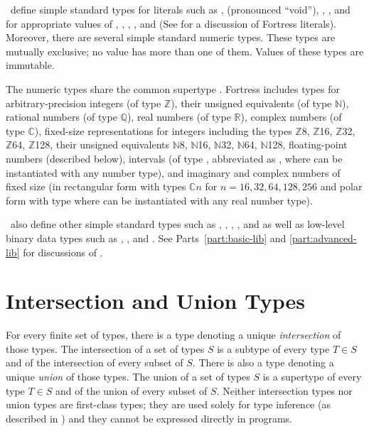 \Library\ define simple standard types for literals such as
,
\TYP{()} (pronounced ``void''),
, , and
for appropriate values of , , , , and 
(See  for a discussion of Fortress literals).
Moreover, there are several simple standard numeric types.
These types are mutually exclusive; no value has more than one of them.
Values of these types are immutable.

The numeric types share the common supertype .
Fortress includes types for
arbitrary-precision integers (of type $\mathbb{Z}$),
their unsigned equivalents (of type $\mathbb{N}$),
rational numbers (of type $\mathbb{Q}$),
real numbers (of type $\mathbb{R}$),
complex numbers (of type $\mathbb{C}$),
fixed-size representations for integers including the types
{$\mathbb{Z}$8}, {$\mathbb{Z}$16}, {$\mathbb{Z}$32}, {$\mathbb{Z}$64},
{$\mathbb{Z}$128}, their unsigned equivalents
{$\mathbb{N}$8}, {$\mathbb{N}$16}, {$\mathbb{N}$32}, {$\mathbb{N}$64},
{$\mathbb{N}$128},
floating-point numbers (described below),
intervals (of type ,
abbreviated as ,
where  can be instantiated
with any number type), and imaginary and complex numbers of fixed size
(in rectangular form with types $\mathbb{C}n$ for $n = 16, 32, 64, 128, 256$
and polar form with type  where  can
be instantiated with any real number type).

\Library\ also define other simple standard types such as ,
, , , and 
as well as low-level binary data types such as ,
, and .
See Parts~\ref{part:basic-lib} and \ref{part:advanced-lib} for discussions
of \library.


\section{Intersection and Union Types}

For every finite set of types, there is a type denoting a unique
\emph{intersection} of those types.
The intersection of a set of types $S$ is a subtype of every type $T \in S$
and of the intersection of every subset of $S$.
There is also a type denoting a unique \emph{union}
of those types. The union of a set of types $S$ is a supertype of every
type $T \in S$ and of the union of every subset of $S$.
Neither intersection types nor union types are first-class types;
they are used solely for type inference (as described in
  ) and
they cannot be expressed directly in programs.

